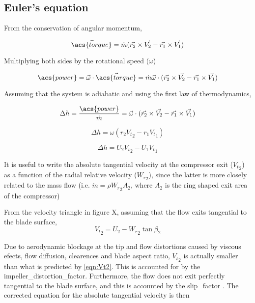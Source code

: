 \documentclass[tcc]{subfiles}
\begin{document}
\subsection{Euler's equation}

From the conservation of angular momentum, 

\begin{equation}
    \vec{\acs{torque}} = \dot{m} (\vec{r_2}\cross\vec{V_2} - \vec{r_1}\cross\vec{V_1}) 
\end{equation}

Multiplying both sides by the rotational speed ($\omega$)

\begin{equation}
    \acs{power} = \vec{\omega}\cdot\vec{\acs{torque}} 
                = \dot{m} \vec{\omega} \cdot (\vec{r_2}\cross\vec{V_2} - \vec{r_1}\cross\vec{V_1}) 
\end{equation}

Assuming that the system is adiabatic and using the first law of thermodynamics,

\begin{equation}
    \Delta h = \frac{\acs{power}}{\dot{m}} 
             = \vec{\omega} \cdot (\vec{r_2}\cross\vec{V_2} - \vec{r_1}\cross\vec{V_1}) 
\end{equation}

\begin{equation}
    \Delta h = \omega (r_2 {V_t}_2 - r_1 {V_t}_1) 
\end{equation}

\begin{equation}
    \label{eqn:euler}
    \Delta h = U_2 {V_t}_2 - U_1 {V_t}_1 
\end{equation}

It is useful to write the absolute tangential velocity at the compressor exit (${V_t}_2$)
as a function of the radial relative velocity (${W_r}_2$),
since the latter is more closely related to the mass flow 
(i.e. $\dot{m} = \rho {W_r}_2 A_2$, where $A_2$ is the ring shaped exit area of the compressor)


From the velocity triangle in figure X, assuming that the flow exits tangential to the blade surface,
\begin{equation}
    \label{eqn:Vt2}
    {V_t}_2 = U_2 - {W_r}_2 \tan\beta_2
\end{equation}

Due to aerodynamic blockage at the tip and flow distortions caused by viscous efects, flow diffusion, clearences and blade aspect ratio,
${V_t}_2$ is actually smaller than what is predicted by \cref{eqn:Vt2}.
This is accounted for by the \acf{impeller_distortion_factor}.
Furthermore, the flow does not exit perfectly tangential to the blade surface, and this is accounted by the \acf{slip_factor} \cite{Wiesner1967,Aungier1995}.
The corrected equation for the absolute tangential velocity is then
\end{document}
